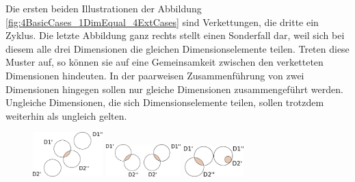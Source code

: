 \documentclass[11pt]{article}
\begin{document}
\noindent
Die ersten beiden Illustrationen der Abbildung \ref{fig:4BasicCases_1DimEqual_4ExtCases} sind Verkettungen, die dritte ein Zyklus. Die letzte Abbildung ganz rechts stellt einen Sonderfall dar, weil sich bei diesem alle drei Dimensionen die gleichen Dimensionselemente teilen. Treten diese Muster auf, so können sie auf eine Gemeinsamkeit zwischen den verketteten Dimensionen hindeuten. In der paarweisen Zusammenführung von zwei Dimensionen hingegen sollen nur gleiche Dimensionen zusammengeführt werden. Ungleiche Dimensionen, die sich Dimensionselemente teilen, sollen trotzdem weiterhin als ungleich gelten. \\

\begin{figure}[!htb]
    \centering
    \includegraphics[width=2.7cm]{CaseDifferentiation/CaseDifferentiation_2SameDim_Cross_1DimSomeDePairPartnered_1DimNoDePairPartnered.pdf}
  \label{}
\endminipage\hfill
{}
    \centering
    \includegraphics[width=2.9cm]{CaseDifferentiation/CaseDifferentiation_2SameDim_Cross_1DimSomeDePairPartnered_Cross_1DimSomeDePairPartnered.pdf}
  \label{}
\endminipage\hfill
{}%
    \centering
    \includegraphics[width=2.3cm]{CaseDifferentiation/CaseDifferentiation_2SameDim_TwoDimSeperate_OneDiffInAnother_TwoDiffShareSomeDE.pdf}
  \label{}
\endminipage
\end{figure}
\end{document}
